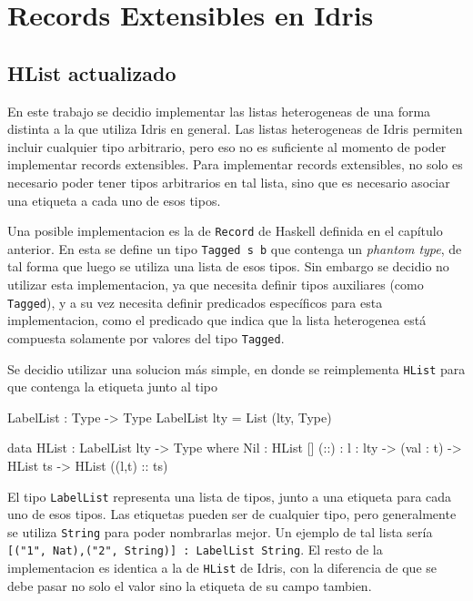 
\chapter{Records Extensibles en Idris}
\label{ch:3}

\section{HList actualizado}
En este trabajo se decidio implementar las listas heterogeneas de una forma distinta a la que utiliza Idris en general. Las listas heterogeneas de Idris permiten incluir cualquier tipo arbitrario, pero eso no es suficiente al momento de poder implementar records extensibles. Para implementar records extensibles, no solo es necesario poder tener tipos arbitrarios en tal lista, sino que es necesario asociar una etiqueta a cada uno de esos tipos.

Una posible implementacion es la de \texttt{Record} de Haskell definida en el capítulo anterior. En esta se define un tipo \texttt{Tagged s b} que contenga un \textit{phantom type}, de tal forma que luego se utiliza una lista de esos tipos. Sin embargo se decidio no utilizar esta implementacion, ya que necesita definir tipos auxiliares (como \texttt{Tagged}), y a su vez necesita definir predicados específicos para esta implementacion, como el predicado que indica que la lista heterogenea está compuesta solamente por valores del tipo \texttt{Tagged}.

Se decidio utilizar una solucion más simple, en donde se reimplementa  \texttt{HList} para que contenga la etiqueta junto al tipo

\begin{code}
LabelList : Type -> Type
LabelList lty = List (lty, Type)

data HList : LabelList lty -> Type where
  Nil : HList []
  (::) : {l : lty} -> (val : t) -> HList ts -> 
    HList ((l,t) :: ts)
\end{code}

El tipo \texttt{LabelList} representa una lista de tipos, junto a una etiqueta para cada uno de esos tipos. Las etiquetas pueden ser de cualquier tipo, pero generalmente se utiliza \texttt{String} para poder nombrarlas mejor. Un ejemplo de tal lista sería \texttt{[("1", Nat),("2", String)] : LabelList String}.
El resto de la implementacion es identica a la de \texttt{HList} de Idris, con la diferencia de que se debe pasar no solo el valor sino la etiqueta de su campo tambien.

